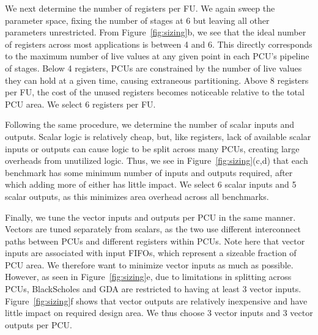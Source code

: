 

We next determine the number of registers per FU. We again sweep the parameter space, fixing the number of stages at 6 but leaving all other parameters unrestricted. 
From Figure~\ref{fig:sizing}b, we see that the ideal number of registers across most applications is between 4 and 6.
This directly corresponds to the maximum number of live values at any given point in each PCU's pipeline of stages.
Below 4 registers, PCUs are constrained by the number of live values they can hold at a given time, causing extraneous partitioning. Above 8 registers per FU,
the cost of the unused registers becomes noticeable relative to the total PCU area.
We select 6 registers per FU.

Following the same procedure, we determine the number of scalar inputs and outputs. Scalar logic is relatively cheap, but, like registers, lack of available scalar 
inputs or outputs can cause logic to be split across many PCUs, creating large overheads from unutilized logic. 
Thus, we see in Figure~\ref{fig:sizing}(c,d) that each benchmark has some minimum number of inputs and outputs required, after 
which adding more of either has little impact. 
We select 6 scalar inputs and 5 scalar outputs, as this minimizes area overhead across all benchmarks.


Finally, we tune the vector inputs and outputs per PCU in the same manner. Vectors are tuned separately from scalars, as the two use different interconnect paths between
PCUs and different registers within PCUs. Note here that vector inputs are associated with input FIFOs, which represent a sizeable fraction
of PCU area. We therefore want to minimize vector inputs as much as possible. However, as seen in Figure~\ref{fig:sizing}e, due to limitations in splitting across PCUs, 
BlackScholes and GDA are restricted to having at least 3 vector inputs.
Figure~\ref{fig:sizing}f shows that vector outputs are relatively inexpensive and have little impact on required design area. 
We thus choose 3 vector inputs and 3 vector outputs per PCU.


